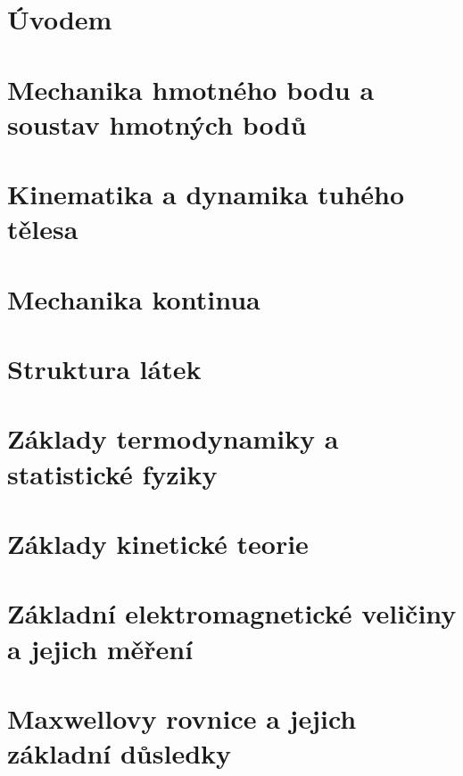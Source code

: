\documentclass[12pt,a4paper, hidelinks]{report}
\begin{document}


\chapter*{Úvodem}

\newpage

\tableofcontents

\newpage
{}

\chapter{Mechanika hmotného bodu a soustav hmotných bodů}
\chapter{Kinematika a dynamika tuhého tělesa}
\chapter{Mechanika kontinua}
\chapter{Struktura látek}
\chapter{Základy termodynamiky a statistické fyziky}
\chapter{Základy kinetické teorie}
\chapter{Základní elektromagnetické veličiny a jejich měření}
\chapter{Maxwellovy rovnice a jejich základní důsledky}
\end{document}
